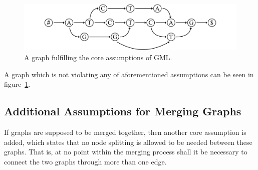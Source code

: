 \documentclass[a4paper,12pt,twoside,BCOR=10mm]{scrbook}
\begin{document}
\begin{figure}[!htb]
\centering
\includegraphics[width=\textwidth]{evo_fig_assume_all_good.pdf}
\caption[Graph fulfilling core assumptions of GML]{A graph fulfilling the core assumptions of GML.} \label{fig:evo_fig_assume_all_good}
\end{figure}

A graph which is not violating any of aforementioned assumptions can be seen in figure~\ref{fig:evo_fig_assume_all_good}.

\subsection{Additional Assumptions for Merging Graphs}

If graphs are supposed to be merged together, then another core assumption is added,
which states that no node splitting is allowed to be needed between these graphs.
That is, at no point within the merging process shall it be necessary to
connect the two graphs through more than one edge.

\end{document}
